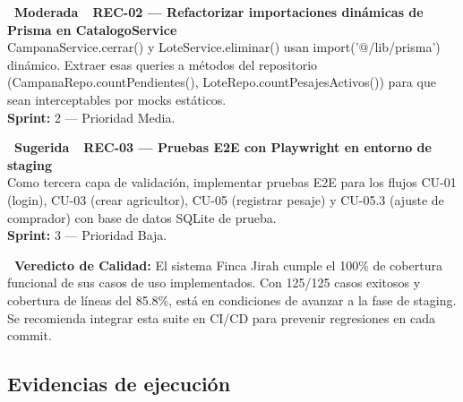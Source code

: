 \documentclass[12pt, a4paper]{article}
\newcommand{\badgeModerate}{\colorbox{CWarningBg}{\color{CWarning}\small\bfseries\ Moderada\ }}
\newcommand{\badgeSuggested}{\colorbox{CAccentBg}{\color{CAccent}\small\bfseries\ Sugerida\ }}
\newcommand{\code}[1]{\colorbox{CCodeBg}{\color{CCode}\ttfamily\small #1}}
\begin{document}
\vspace{8pt}
\begin{defectmoderate}
\textbf{\badgeModerate\ REC-02 --- Refactorizar importaciones dinámicas de Prisma en CatalogoService}\\[4pt]
\code{CampanaService.cerrar()} y \code{LoteService.eliminar()} usan \code{import('@/lib/prisma')} dinámico. Extraer esas queries a métodos del repositorio (\code{CampanaRepo.countPendientes()}, \code{LoteRepo.countPesajesActivos()}) para que sean interceptables por mocks estáticos.\\[4pt]
\textbf{Sprint:} 2 --- Prioridad Media.
\end{defectmoderate}

\vspace{8pt}
\begin{defectsuggested}
\textbf{\badgeSuggested\ REC-03 --- Pruebas E2E con Playwright en entorno de staging}\\[4pt]
Como tercera capa de validación, implementar pruebas E2E para los flujos CU-01 (login), CU-03 (crear agricultor), CU-05 (registrar pesaje) y CU-05.3 (ajuste de comprador) con base de datos SQLite de prueba.\\[4pt]
\textbf{Sprint:} 3 --- Prioridad Baja.
\end{defectsuggested}

\vspace{12pt}
\begin{alertinfo}
\textbf{\faLock\ Veredicto de Calidad:} El sistema Finca Jirah cumple el 100\% de cobertura funcional de sus casos de uso implementados. Con 125/125 casos exitosos y cobertura de líneas del 85.8\%, está en condiciones de avanzar a la fase de staging. Se recomienda integrar esta suite en CI/CD para prevenir regresiones en cada commit.
\end{alertinfo}

\vspace{16pt}
\subsection{Evidencias de ejecución}
\end{document}
